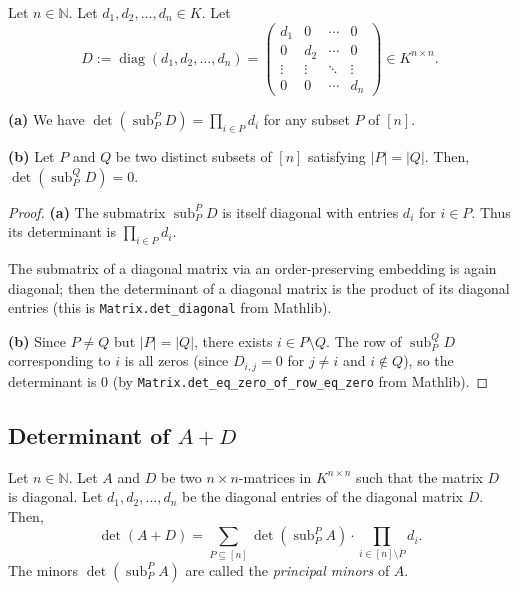 \begin{lemma}
\label{lem.det.minors-diag}
\leantarget
\leanok
Let $n\in\mathbb{N}$. Let $d_1,d_2,\ldots,d_n\in K$.
Let
\[
D:=\operatorname{diag}(d_1,d_2,\ldots,d_n)
=\begin{pmatrix}
d_1 & 0 & \cdots & 0\\
0 & d_2 & \cdots & 0\\
\vdots & \vdots & \ddots & \vdots\\
0 & 0 & \cdots & d_n
\end{pmatrix}\in K^{n\times n}.
\]

\textbf{(a)} We have $\det(\operatorname{sub}_P^P D) = \prod_{i\in P} d_i$
for any subset $P$ of $[n]$.

\textbf{(b)} Let $P$ and $Q$ be two distinct subsets of $[n]$
satisfying $|P|=|Q|$. Then,
$\det(\operatorname{sub}_P^Q D) = 0$.
\end{lemma}

\begin{proof}
\textbf{(a)} The submatrix $\operatorname{sub}_P^P D$ is itself diagonal with entries
$d_i$ for $i\in P$. Thus its determinant is $\prod_{i\in P} d_i$.

The submatrix of a diagonal matrix via an order-preserving embedding
is again diagonal; then the determinant of a diagonal matrix is
the product of its diagonal entries
(this is \texttt{Matrix.det\_diagonal} from Mathlib).

\textbf{(b)} Since $P\ne Q$ but $|P|=|Q|$, there exists $i\in P\setminus Q$.
The row of $\operatorname{sub}_P^Q D$ corresponding to $i$ is all zeros
(since $D_{i,j}=0$ for $j\ne i$ and $i\notin Q$), so the determinant
is $0$ (by \texttt{Matrix.det\_eq\_zero\_of\_row\_eq\_zero} from Mathlib).
\end{proof}

\subsection{Determinant of $A+D$}

\begin{theorem}
\label{thm.det.det(A+D)}
\leantarget
\leanok
Let $n\in\mathbb{N}$. Let $A$ and $D$ be two $n\times n$-matrices in
$K^{n\times n}$ such that the matrix $D$ is diagonal. Let
$d_1,d_2,\ldots,d_n$ be the diagonal entries of the diagonal matrix $D$. Then,
\[
\det(A+D) = \sum_{P\subseteq [n]}
\det(\operatorname{sub}_P^P A) \cdot \prod_{i\in [n]\setminus P} d_i.
\]
The minors $\det(\operatorname{sub}_P^P A)$ are called the
\emph{principal minors} of $A$.
\end{theorem}

